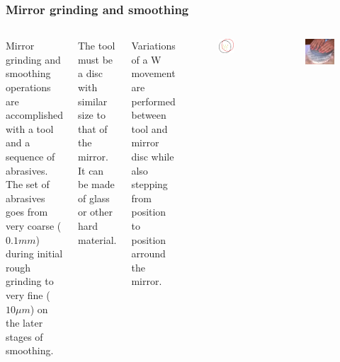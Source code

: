 \documentclass{beamer}
\begin{document}
\begin{frame}
\frametitle{Mirror grinding and smoothing}
\begin{columns}
Mirror grinding and smoothing operations are accomplished with a tool and a sequence of abrasives. The set of abrasives goes from very coarse ($0.1mm$) during initial rough grinding to very fine ($10 \mu m$) on the later stages of smoothing.

The tool must be a disc with similar size to that of the mirror. It can be made of glass or other hard material.

Variations of a W movement are performed between tool and mirror disc while also stepping from position to position arround the mirror.
\begin{figure}
\includegraphics[scale=0.35]{assets/stroke.pdf}
\end{figure}
\begin{figure}
\includegraphics[scale=0.2]{assets/grinding.jpg}
\end{figure}
\end{columns}
\end{frame}
\end{document}

